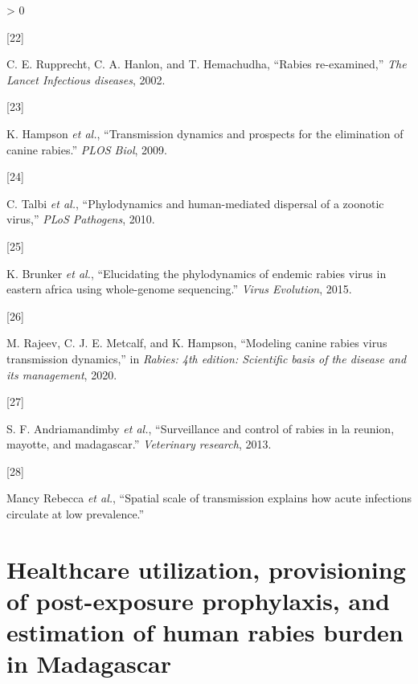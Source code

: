 \documentclass[
  oneside]{book}
\newlength{\cslhangindent}
\newlength{\csllabelwidth}
\newenvironment{CSLReferences}[2] %
 {%
  \setlength{\parindent}{0pt}
  \ifodd #1 \everypar{\setlength{\hangindent}{\cslhangindent}}\ignorespaces\fi
  \ifnum #2 > 0
  \setlength{\parskip}{#2\baselineskip}
  \fi
 }%
 {}
\newcommand{\CSLLeftMargin}[1]{\parbox[t]{\csllabelwidth}{#1}}
\newcommand{\CSLRightInline}[1]{\parbox[t]{\linewidth - \csllabelwidth}{#1}\break}
\begin{document}
\begin{CSLReferences}{0}{0}
\leavevmode\hypertarget{ref-rupprecht2002}{}%
\CSLLeftMargin{{[}22{]} }
\CSLRightInline{C. E. Rupprecht, C. A. Hanlon, and T. Hemachudha, {``Rabies re-examined,''} \emph{The Lancet Infectious diseases}, 2002.}

\leavevmode\hypertarget{ref-hampson2009}{}%
\CSLLeftMargin{{[}23{]} }
\CSLRightInline{K. Hampson \emph{et al.}, {``Transmission dynamics and prospects for the elimination of canine rabies.''} \emph{PLOS Biol}, 2009.}

\leavevmode\hypertarget{ref-talbi2010}{}%
\CSLLeftMargin{{[}24{]} }
\CSLRightInline{C. Talbi \emph{et al.}, {``Phylodynamics and human-mediated dispersal of a zoonotic virus,''} \emph{PLoS Pathogens}, 2010.}

\leavevmode\hypertarget{ref-brunker2015}{}%
\CSLLeftMargin{{[}25{]} }
\CSLRightInline{K. Brunker \emph{et al.}, {``Elucidating the phylodynamics of endemic rabies virus in eastern africa using whole-genome sequencing.''} \emph{Virus Evolution}, 2015.}

\leavevmode\hypertarget{ref-rajeev2020modeling}{}%
\CSLLeftMargin{{[}26{]} }
\CSLRightInline{M. Rajeev, C. J. E. Metcalf, and K. Hampson, {``Modeling canine rabies virus transmission dynamics,''} in \emph{Rabies: 4th edition: Scientific basis of the disease and its management}, 2020.}

\leavevmode\hypertarget{ref-andriamandimby2013}{}%
\CSLLeftMargin{{[}27{]} }
\CSLRightInline{S. F. Andriamandimby \emph{et al.}, {``Surveillance and control of rabies in la reunion, mayotte, and madagascar.''} \emph{Veterinary research}, 2013.}

\leavevmode\hypertarget{ref-Mancyinprep}{}%
\CSLLeftMargin{{[}28{]} }
\CSLRightInline{Mancy Rebecca \emph{et al.}, {``Spatial scale of transmission explains how acute infections circulate at low prevalence.''}}

\end{CSLReferences}

\hypertarget{healthcare-utilization-provisioning-of-post-exposure-prophylaxis-and-estimation-of-human-rabies-burden-in-madagascar}{%
\chapter{Healthcare utilization, provisioning of post-exposure prophylaxis, and estimation of human rabies burden in Madagascar}\label{healthcare-utilization-provisioning-of-post-exposure-prophylaxis-and-estimation-of-human-rabies-burden-in-madagascar}}
\end{document}
